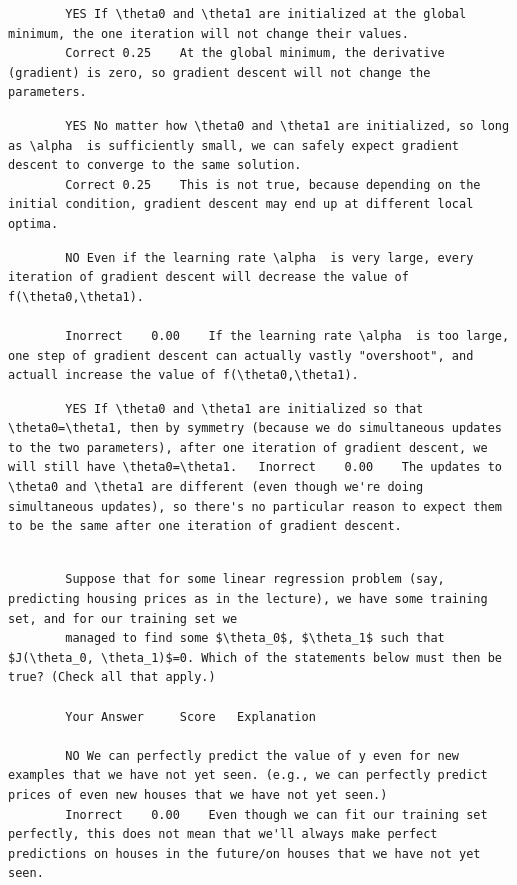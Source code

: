 		\begin{verbatim}
		YES If \theta0 and \theta1 are initialized at the global minimum, the one iteration will not change their values.	
		Correct	0.25	At the global minimum, the derivative (gradient) is zero, so gradient descent will not change the parameters.
		\end{verbatim}
		
		\begin{verbatim}
		YES No matter how \theta0 and \theta1 are initialized, so long as \alpha  is sufficiently small, we can safely expect gradient descent to converge to the same solution.	
		Correct	0.25	This is not true, because depending on the initial condition, gradient descent may end up at different local optima.
		\end{verbatim}
		
		\begin{verbatim}
		NO Even if the learning rate \alpha  is very large, every iteration of gradient descent will decrease the value of f(\theta0,\theta1).	
		
		Inorrect	0.00	If the learning rate \alpha  is too large, one step of gradient descent can actually vastly "overshoot", and actuall increase the value of f(\theta0,\theta1).
		\end{verbatim}
		
		\begin{verbatim}
		YES If \theta0 and \theta1 are initialized so that \theta0=\theta1, then by symmetry (because we do simultaneous updates to the two parameters), after one iteration of gradient descent, we will still have \theta0=\theta1.	Inorrect	0.00	The updates to \theta0 and \theta1 are different (even though we're doing simultaneous updates), so there's no particular reason to expect them to be the same after one iteration of gradient descent.
		\end{verbatim}
		
		\begin{verbatim}
		
		Suppose that for some linear regression problem (say, predicting housing prices as in the lecture), we have some training set, and for our training set we 
		managed to find some $\theta_0$, $\theta_1$ such that $J(\theta_0, \theta_1)$=0. Which of the statements below must then be true? (Check all that apply.)
		
		Your Answer		Score	Explanation
		
		NO We can perfectly predict the value of y even for new examples that we have not yet seen. (e.g., we can perfectly predict prices of even new houses that we have not yet seen.)	
		Inorrect	0.00	Even though we can fit our training set perfectly, this does not mean that we'll always make perfect predictions on houses in the future/on houses that we have not yet seen.
		\end{verbatim}
		
